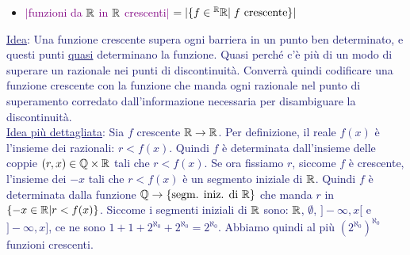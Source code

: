 \begin{itemize}
	\item \textcolor{purple}{$|$funzioni da $\mathbb R$ in $\mathbb R$ crescenti$|$ $= |\{f \in {}^\mathbb R \mathbb R | \; \text{$f$ crescente}\}|$}
\end{itemize}

\textcolor{MidnightBlue}{\underline{Idea}: Una funzione crescente supera ogni barriera in un punto ben determinato, e questi punti \underline{quasi} determinano la funzione. Quasi perch\'e c'\`e pi\`u di un modo di superare un razionale nei punti di discontinuit\`a. Converr\`a quindi codificare una funzione crescente con la funzione che manda ogni razionale nel punto
di superamento corredato dall'informazione necessaria per disambiguare la discontinuit\`a.}\\
\textcolor{MidnightBlue}{\underline{Idea pi\`u dettagliata}: Sia $f$ crescente $\mathbb R \to \mathbb R$. Per definizione, il reale $f(x)$ \`e l'insieme dei razionali: $r < f(x)$. Quindi $f$ \`e determinata dall'insieme delle coppie $(r,x) \in \mathbb Q \times \mathbb R$ tali che $r < f(x)$.
Se ora fissiamo $r$, siccome $f$ \`e crescente, l'insieme dei $-x$ tali che $r < f(x)$ \`e un segmento iniziale di $\mathbb R$. Quindi $f$ \`e determinata dalla funzione $\mathbb Q \to \{\text{segm. iniz. di $\mathbb R$}\}$ che manda $r$ in $\{-x \in \mathbb R | r < f(x)\}$. Siccome i segmenti iniziali di $\mathbb R$ sono: $\mathbb R$, $\emptyset$, $]-\infty,x[$ e $]-\infty,x]$, ce ne sono $1+1+2^{\aleph_0}+2^{\aleph_0} = 2^{\aleph_0}$.
Abbiamo quindi al pi\`u $(2^{\aleph_0})^{\aleph_0}$ funzioni crescenti.}

